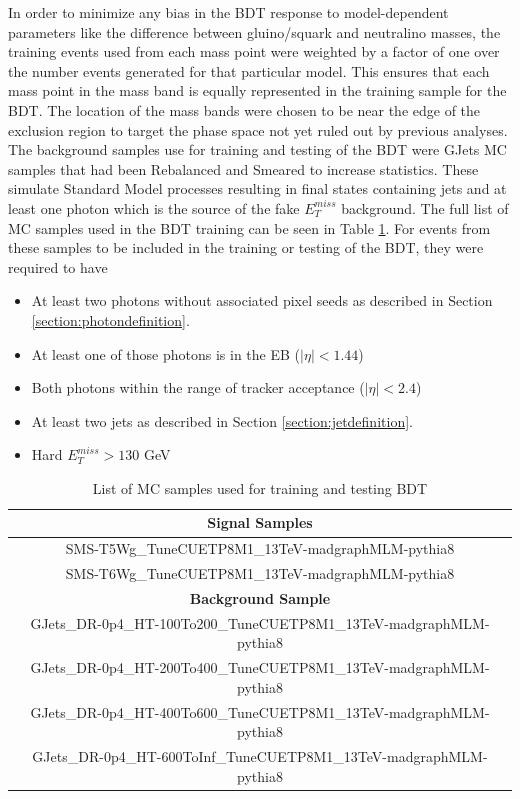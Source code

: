 In order to minimize any bias in the BDT response to  model-dependent parameters like the difference between gluino/squark and neutralino masses, the training events used from each mass point were weighted by a factor of one over the number events generated for that particular model.  This ensures that each mass point in the mass band is equally represented in the training sample for the BDT.  The location of the mass bands were chosen to be near the edge of the exclusion region to target the phase space not yet ruled out by previous analyses.  The background samples use for training and testing of the BDT were GJets MC samples that had been Rebalanced and Smeared to increase statistics. These simulate Standard Model processes resulting in final states containing jets and at least one photon which is the source of the fake $E^{miss}_T$ background.  The full list of MC samples used in the BDT training can be seen in Table \ref{table:TrainingSamples}.  For events from these samples to be included in the training or testing of the BDT, they were required to have
\begin{itemize}
	\item At least two photons without associated pixel seeds as described in Section \ref{section:photondefinition}.
	\item At least one of those photons is in the EB ($|\eta|<1.44$)
	\item Both photons within the range of tracker acceptance ($|\eta|<2.4$)
	\item At least two jets as described in Section \ref{section:jetdefinition}.
	\item Hard $E^{miss}_T>130$ GeV
\end{itemize}

\begin{table}[h]
	\centering
	\caption{List of MC samples used for training and testing BDT}
	\begin{tabular}{|c|}
		\hline
		\textbf{Signal Samples} \\  
		\hline
		SMS-T5Wg\_TuneCUETP8M1\_13TeV-madgraphMLM-pythia8\\
		\hline
		SMS-T6Wg\_TuneCUETP8M1\_13TeV-madgraphMLM-pythia8\\
		\hline
		\textbf{Background Sample} \\ 
		\hline
		GJets\_DR-0p4\_HT-100To200\_TuneCUETP8M1\_13TeV-madgraphMLM-pythia8 \\
		\hline
		GJets\_DR-0p4\_HT-200To400\_TuneCUETP8M1\_13TeV-madgraphMLM-pythia8 \\
		\hline
		GJets\_DR-0p4\_HT-400To600\_TuneCUETP8M1\_13TeV-madgraphMLM-pythia8 \\
		\hline
		GJets\_DR-0p4\_HT-600ToInf\_TuneCUETP8M1\_13TeV-madgraphMLM-pythia8 \\
		\hline
	\end{tabular}
	\label{table:TrainingSamples}
\end{table}

